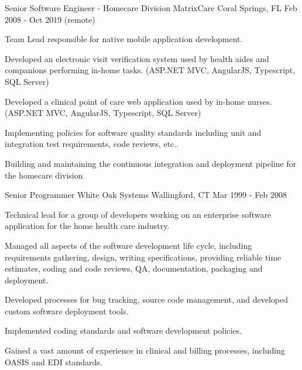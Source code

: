 \begin{cventries}
  \cventry
    {Senior Software Engineer - Homecare Division} %
    {MatrixCare} %
    {Coral Springs, FL} %
    {Feb 2008 - Oct 2019 (remote)} %
    {
      \begin{cvitems} %
        \item {Team Lead responsible for native mobile application development.}
        \item {Developed an electronic visit verification system used by health aides and companions performing in-home tasks. (ASP.NET MVC, AngularJS, Typescript, SQL Server)}
        \item {Developed a clinical point of care web application used by in-home nurses. (ASP.NET MVC, AngularJS, Typescript, SQL Server)}
        \item {Implementing policies for software quality standards including unit and integration test requirements, code reviews, etc..}
        \item {Building and maintaining the continuous integration and deployment pipeline for the homecare division}
      \end{cvitems}
    }
  \cventry
    {Senior Programmer} %
    {White Oak Systems} %
    {Wallingford, CT} %
    {Mar 1999 - Feb 2008} %
    {
      \begin{cvitems} %
        \item {Technical lead for a group of developers working on an enterprise software application for the home health care industry.}
        \item {Managed all aspects of the software development life cycle, including requirements gathering, design, writing specifications, providing reliable time estimates, coding and code reviews, QA, documentation, packaging and deployment.}
         \item {Developed processes for bug tracking, source code management, and developed custom software deployment tools.}
         \item {Implemented coding standards and software development policies.}
         \item {Gained a vast amount of experience in clinical and billing processes, including OASIS and EDI standards.}
      \end{cvitems}
    }


\end{cventries}
